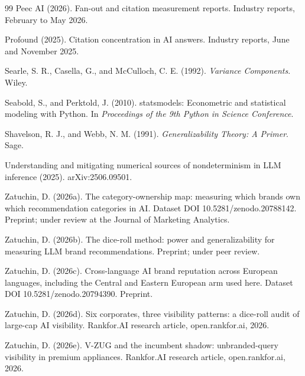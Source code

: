 \documentclass[pdflatex,sn-mathphys-num]{sn-jnl}
\begin{document}
\begin{thebibliography}{99}
 Peec AI (2026). Fan-out and citation measurement reports. Industry reports, February to May 2026.

 Profound (2025). Citation concentration in AI answers. Industry reports, June and November 2025.

 Searle, S. R., Casella, G., and McCulloch, C. E. (1992). \emph{Variance Components}. Wiley.

 Seabold, S., and Perktold, J. (2010). statsmodels: Econometric and statistical modeling with Python. In \emph{Proceedings of the 9th Python in Science Conference}.

 Shavelson, R. J., and Webb, N. M. (1991). \emph{Generalizability Theory: A Primer}. Sage.

 Understanding and mitigating numerical sources of nondeterminism in LLM inference (2025). arXiv:2506.09501.

 Zatuchin, D. (2026a). The category-ownership map: measuring which brands own which recommendation categories in AI. Dataset DOI 10.5281/zenodo.20788142. Preprint; under review at the Journal of Marketing Analytics.

 Zatuchin, D. (2026b). The dice-roll method: power and generalizability for measuring LLM brand recommendations. Preprint; under peer review.

 Zatuchin, D. (2026c). Cross-language AI brand reputation across European languages, including the Central and Eastern European arm used here. Dataset DOI 10.5281/zenodo.20794390. Preprint.

 Zatuchin, D. (2026d). Six corporates, three visibility patterns: a dice-roll audit of large-cap AI visibility. Rankfor.AI research article, open.rankfor.ai, 2026.

 Zatuchin, D. (2026e). V-ZUG and the incumbent shadow: unbranded-query visibility in premium appliances. Rankfor.AI research article, open.rankfor.ai, 2026.
\end{thebibliography}
\end{document}

